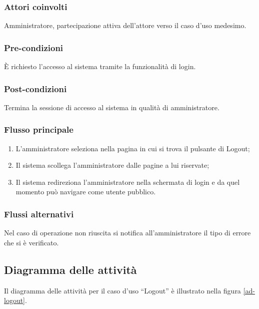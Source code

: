 \subsubsection*{Attori coinvolti}
Amministratore, partecipazione attiva dell'attore verso il caso d'uso medesimo.

\subsubsection*{Pre-condizioni}
È richiesto l'accesso al sistema tramite la funzionalità di login.

\subsubsection*{Post-condizioni}
Termina la sessione di accesso al sistema in qualità di amministratore.

\subsubsection*{Flusso principale}

\begin{enumerate}
	
	\item
	L'amministratore seleziona nella pagina in cui si trova il pulsante di Logout;
	
	\item
	Il sistema scollega l'amministratore dalle pagine a lui riservate;
	
	\item
	Il sistema redireziona l'amministratore nella schermata di login e da quel momento può navigare come utente pubblico.
	
\end{enumerate}

\subsubsection*{Flussi alternativi}
Nel caso di operazione non riuscita si notifica all'amministratore il tipo di errore che si è verificato.

\subsection*{Diagramma delle attività}
Il diagramma delle attività per il caso d'uso ``Logout'' è illustrato nella figura \vref{ad-logout}.


%
%
